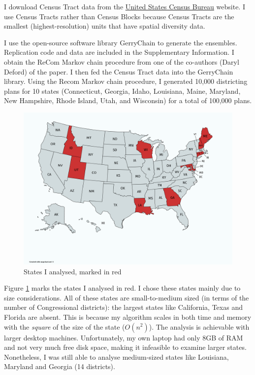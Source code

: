 \documentclass[]{article}
\begin{document}
I download Census Tract data from the \href{census.gov}{United States
Census Bureau} website. I use Census Tracts rather than Census Blocks
because Census Tracts are the smallest (highest-resolution) units that
have spatial diversity data.

I use the open-source software library GerryChain to generate the
ensembles. Replication code and data are included in the Supplementary
Information. I obtain the ReCom Markov chain procedure from one of the
co-authors (Daryl Deford) of the \cite{ddj2019recom} paper. I then fed
the Census Tract data into the GerryChain library. Using the Recom
Markov chain procedure, I generated 10,000 districting plans for 10
states (Connecticut, Georgia, Idaho, Louisiana, Maine, Maryland, New
Hampshire, Rhode Island, Utah, and Wisconsin) for a total of 100,000
plans.

\begin{figure}
\centering
\includegraphics{./img/states_analysed.png}
\caption{States I analysed, marked in red \label{states_analysed}}
\end{figure}

Figure \ref{states_analysed} marks the states I analysed in red. I chose
these states mainly due to size considerations. All of these states are
small-to-medium sized (in terms of the number of Congressional
districts): the largest states like California, Texas and Florida are
absent. This is because my algorithm scales in both time and memory with
the \emph{square} of the size of the state (\(O(n^2)\)). The analysis is
achievable with larger desktop machines. Unfortunately, my own laptop
had only 8GB of RAM and not very much free disk space, making it
infeasible to examine larger states. Nonetheless, I was still able to
analyse medium-sized states like Louisiana, Maryland and Georgia (14
districts).
\end{document}
